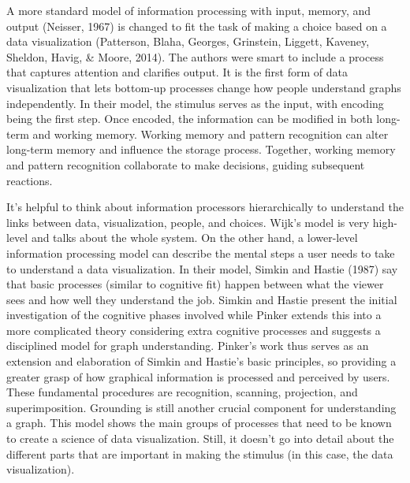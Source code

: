 \documentclass[print]{nuthesis}
\begin{document}
A more standard model of information processing with input, memory, and output (Neisser, 1967) is changed to fit the task of making a choice based on a data visualization (Patterson, Blaha, Georges, Grinstein, Liggett, Kaveney, Sheldon, Havig, \& Moore, 2014).
The authors were smart to include a process that captures attention and clarifies output. It is the first form of data visualization that lets bottom-up processes change how people understand graphs independently.
In their model, the stimulus serves as the input, with encoding being the first step.
Once encoded, the information can be modified in both long-term and working memory.
Working memory and pattern recognition can alter long-term memory and influence the storage process. Together, working memory and pattern recognition collaborate to make decisions, guiding subsequent reactions.

It's helpful to think about information processors hierarchically to understand the links between data, visualization, people, and choices. Wijk's model is very high-level and talks about the whole system.
On the other hand, a lower-level information processing model can describe the mental steps a user needs to take to understand a data visualization.
In their model, Simkin and Hastie (1987) say that basic processes (similar to cognitive fit) happen between what the viewer sees and how well they understand the job.
Simkin and Hastie present the initial investigation of the cognitive phases involved while Pinker extends this into a more complicated theory considering extra cognitive processes and suggests a disciplined model for graph understanding.
Pinker's work thus serves as an extension and elaboration of Simkin and Hastie's basic principles, so providing a greater grasp of how graphical information is processed and perceived by users.
These fundamental procedures are recognition, scanning, projection, and superimposition.
Grounding is still another crucial component for understanding a graph.
This model shows the main groups of processes that need to be known to create a science of data visualization. Still, it doesn't go into detail about the different parts that are important in making the stimulus (in this case, the data visualization).
\end{document}
